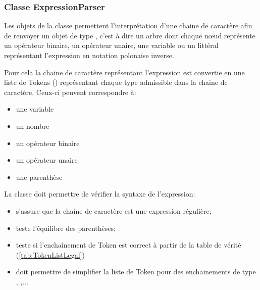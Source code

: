\subsubsection{Classe ExpressionParser}

Les objets de la classe   permettent l'interprétation d'une chaine de caractère afin de renvoyer un objet de type , c'est à dire un arbre dont chaque n\oe ud représente un opérateur binaire, un opérateur unaire, une variable ou un littéral représentant l'expression en notation polonaise inverse.

Pour cela la chaine de caractère représentant l'expression est convertie en une liste de Tokens () représentant chaque type admissible dans la chaine de caractère. Ceux-ci peuvent correspondre à:
\begin{itemize}
	\item une variable 
	\item un nombre 
	\item un opérateur binaire 
	\item un opérateur unaire 
	\item une parenthèse 
\end{itemize}

La classe doit permettre de vérifier la syntaxe de l'expression:
\begin{itemize}
	\item {} s'assure que la chaîne de caractère est une expression régulière;
	\item {} teste l'équilibre des parenthèses;
	\item {} teste si l'enchaînement de Token est correct à partir de la table de vérité (\ref{tab:TokenListLegal})
	\item {} doit permettre de simplifier la liste de Token pour des enchainements de type , ,...
\end{itemize}

